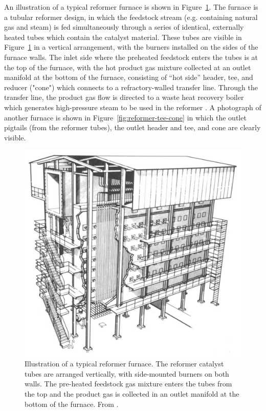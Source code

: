 An illustration of a typical reformer furnace is shown in Figure~\ref{fig:reformer-furnace}. The furnace is a tubular reformer design, in which the feedstock stream (e.g. containing natural gas and steam) is fed simultaneously through a series of identical, externally heated tubes which contain the catalyst material. These tubes are visible in Figure~\ref{fig:reformer-furnace} in a vertical arrangement, with the burners installed on the sides of the furnace walls. The inlet side where the preheated feedstock enters the tubes is at the top of the furnace, with the hot product gas mixture collected at an outlet manifold at the bottom of the furnace, consisting of ``hot side'' header, tee, and reducer ("cone") which connects to a refractory-walled transfer line. Through the transfer line, the product gas flow is directed to a waste heat recovery boiler which generates high-pressure steam to be used in the reformer \cite{rostrup-nielsen_catalytic_1984}. A photograph of another furnace is shown in Figure~\ref{fig:reformer-tee-cone} \cite{penso_repair_2006} in which the outlet pigtails (from the reformer tubes), the outlet header and tee, and cone are clearly visible.

\begin{figure}[h]
\centering
\includegraphics{figures/reformer-furnace}
\caption{Illustration of a typical reformer furnace. The reformer catalyst tubes are arranged vertically, with side-mounted burners on both walls. The pre-heated feedstock gas mixture enters the tubes from the top and the product gas is collected in an outlet manifold at the bottom of the furnace.  From \citet[Fig.~9]{rostrup-nielsen_catalytic_1984}.}
\label{fig:reformer-furnace}
\end{figure}


